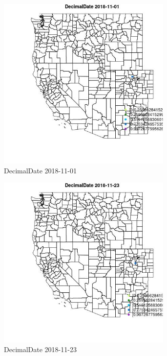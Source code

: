 \begin{figure} 
\centering  
\includegraphics[width=0.77\textwidth]{Code_Outputs/Report_ML_input_PM25_Step4_part_e_de_duplicated_aves_MapObsDecimalDate2018-11-01.jpg} 
\caption{\label{fig:Report_ML_input_PM25_Step4_part_e_de_duplicated_avesMapObsDecimalDate2018-11-01}DecimalDate 2018-11-01} 
\end{figure} 
 

\begin{figure} 
\centering  
\includegraphics[width=0.77\textwidth]{Code_Outputs/Report_ML_input_PM25_Step4_part_e_de_duplicated_aves_MapObsDecimalDate2018-11-23.jpg} 
\caption{\label{fig:Report_ML_input_PM25_Step4_part_e_de_duplicated_avesMapObsDecimalDate2018-11-23}DecimalDate 2018-11-23} 
\end{figure} 
 
